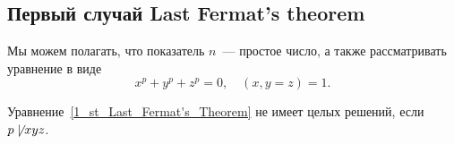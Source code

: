 	
	\subsection{Первый случай Last Fermat's theorem}

	Мы можем полагать, что показатель $n$~--- простое число, а также рассматривать уравнение в виде 
	\begin{equation}
		x^p + y^p + z^p = 0, \quad (x, y = z) = 1. \label{1_st_Last_Fermat's_Theorem}
	\end{equation}
	

	\begin{theorem}
		Уравнение~\ref{1_st_Last_Fermat's_Theorem} не имеет целых решений, если $p \not \mid xyz$.
	\end{theorem}

